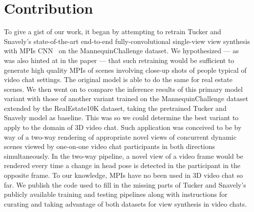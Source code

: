 \section{Contribution}\label{sec:contribution} 

To give a gist of our work, it began by attempting to retrain Tucker and Snavely's state-of-the-art end-to-end fully-convolutional single-view view synthesis with MPIs CNN~\cite{single_view_mpi} on the MannequinChallenge dataset. We hypothesized --- as was also hinted at in the paper --- that such retraining would be sufficient to generate high quality MPIs of scenes involving close-up shots of people typical of video chat settings. The original model is able to do the same for real estate scenes. We then went on to compare the inference results of this primary model variant with those of another variant trained on the MannequinChallenge dataset extended by the RealEstate10K dataset, taking the pretrained Tucker and Snavely model as baseline. This was so we could determine the best variant to apply to the domain of 3D video chat. Such application was conceived to be by way of a two-way rendering of appropriate novel views of concurrent dynamic scenes viewed by one-on-one video chat participants in both directions simultaneously. In the two-way pipeline, a novel view of a video frame would be rendered every time a change in head pose is detected in the participant in the opposite frame. To our knowledge, MPIs have no been used in 3D video chat so far. We publish the code used to fill in the missing parts of Tucker and Snavely's publicly available training and testing pipelines along with instructions for curating and taking advantage of both datasets for view synthesis in video chats.
